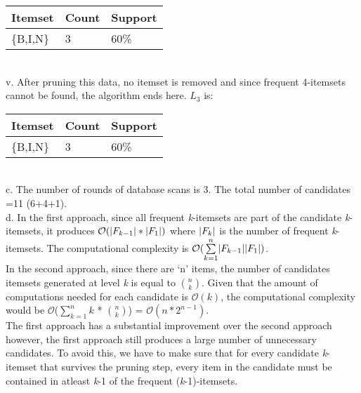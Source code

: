 \documentclass[10pt]{article}
\DeclarePairedDelimiter{\abs}{\lvert}{\rvert}
\begin{document}
\begin{flushleft}
\begin{tabular}{| l | l | l |}
\hline
Itemset & Count & Support \\ \hline
\{B,I,N\} & 3 & 60\%\\ \hline
\end{tabular}
\\
\vspace{0.5em}
v. After pruning this data, no itemset is removed and since frequent 4-itemsets cannot be found, the algorithm ends here. $L_{3}$ is: \\
\vspace{0.5em}
\begin{tabular}{| l | l | l |}
\hline
Itemset & Count & Support \\ \hline
\{B,I,N\} & 3 & 60\%\\ \hline
\end{tabular}
\\
\vspace{0.5em}
c. The number of rounds of database scans is 3. The total number of candidates =11 (6+4+1).\\
\vspace{0.5em}
d. In the first approach, since all frequent \textit{k}-itemsets are part of the candidate \textit{k}-itemsets, it produces $\mathcal{O}(\abs{F_{k-1}} * \abs{F_{1}})$ where $\abs{F_{k}}$ is the number of frequent \textit{k}-itemsets. The computational complexity is $\mathcal{O}(\sum\limits_{k=1}^n \abs{F_{k-1}}\abs{F_{1}})$.\\ 
In the second approach, since there are `n' items, the number of candidates itemsets generated at level \textit{k} is equal to ${n\choose k}$. Given that the amount of computations needed for each candidate is $\mathcal{O}(k)$, the computational complexity would be $\mathcal{O}$($\sum\limits_{k=1}^n k$ * $n\choose k$) = $\mathcal{O}(n * 2^{n-1})$.\\
The first approach has a substantial improvement over the second approach however, the first approach still produces a large number of unnecessary candidates. To avoid this, we have to make sure that for every candidate \textit{k}-itemset that survives the pruning step, every item in the candidate must be contained in atleast \textit{k}-1 of the frequent (\textit{k}-1)-itemsets.\\ 
\end{flushleft}
\end{document}
